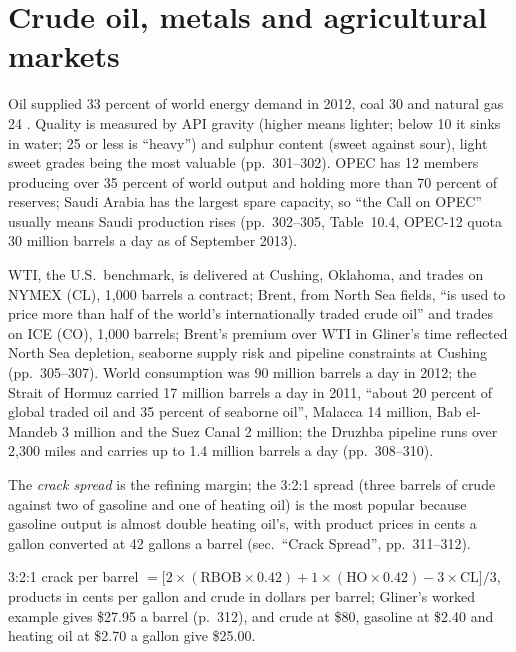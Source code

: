 \section{Crude oil, metals and agricultural markets}

\begin{qfdefinition}\label{def:crude-oil-markets}
 Oil supplied 33 percent of world energy demand in 2012, coal 30 and natural gas 24 \citep[chap.~10, sec.\ ``Energy'', PDF p.~301]{s7-gliner}. Quality is measured by API gravity (higher means lighter; below 10 it sinks in water; 25 or less is ``heavy'') and sulphur content (sweet against sour), light sweet grades being the most valuable (pp.~301--302). OPEC has 12 members producing over 35 percent of world output and holding more than 70 percent of reserves; Saudi Arabia has the largest spare capacity, so ``the Call on OPEC'' usually means Saudi production rises (pp.~302--305, Table~10.4, OPEC-12 quota 30 million barrels a day as of September 2013).

WTI, the U.S.\ benchmark, is delivered at Cushing, Oklahoma, and trades on NYMEX (CL), 1,000 barrels a contract; Brent, from North Sea fields, ``is used to price more than half of the world's internationally traded crude oil'' and trades on ICE (CO), 1,000 barrels; Brent's premium over WTI in Gliner's time reflected North Sea depletion, seaborne supply risk and pipeline constraints at Cushing (pp.~305--307). World consumption was 90 million barrels a day in 2012; the Strait of Hormuz carried 17 million barrels a day in 2011, ``about 20 percent of global traded oil and 35 percent of seaborne oil'', Malacca 14 million, Bab el-Mandeb 3 million and the Suez Canal 2 million; the Druzhba pipeline runs over 2,300 miles and carries up to 1.4 million barrels a day (pp.~308--310).

The \emph{crack spread} is the refining margin; the 3:2:1 spread (three barrels of crude against two of gasoline and one of heating oil) is the most popular because gasoline output is almost double heating oil's, with product prices in cents a gallon converted at 42 gallons a barrel (sec.\ ``Crack Spread'', pp.~311--312).

 3:2:1 crack per barrel $=\big[2\times(\text{RBOB}\times0.42)+1\times(\text{HO}\times0.42)-3\times\text{CL}\big]/3$, products in cents per gallon and crude in dollars per barrel; Gliner's worked example gives \$27.95 a barrel (p.~312), and crude at \$80, gasoline at \$2.40 and heating oil at \$2.70 a gallon give \$25.00.


\end{qfdefinition}

